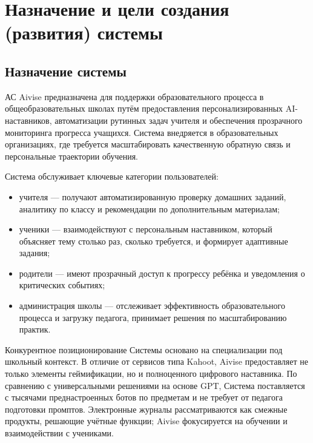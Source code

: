 \documentclass[14pt,a4paper]{extarticle}
\begin{document}
\section{Назначение и цели создания (развития) системы}
\subsection{Назначение системы}
АС Aivise предназначена для поддержки образовательного процесса в общеобразовательных школах путём предоставления персонализированных AI-наставников, автоматизации рутинных задач учителя и обеспечения прозрачного мониторинга прогресса учащихся. Система внедряется в образовательных организациях, где требуется масштабировать качественную обратную связь и персональные траектории обучения.

Система обслуживает ключевые категории пользователей:
\begin{itemize}
  \item учителя — получают автоматизированную проверку домашних заданий, аналитику по классу и рекомендации по дополнительным материалам;
  \item ученики — взаимодействуют с персональным наставником, который объясняет тему столько раз, сколько требуется, и формирует адаптивные задания;
  \item родители — имеют прозрачный доступ к прогрессу ребёнка и уведомления о критических событиях;
  \item администрация школы — отслеживает эффективность образовательного процесса и загрузку педагога, принимает решения по масштабированию практик.
\end{itemize}

Конкурентное позиционирование Системы основано на специализации под школьный контекст. В отличие от сервисов типа Kahoot, Aivise предоставляет не только элементы геймификации, но и полноценного цифрового наставника. По сравнению с универсальными решениями на основе GPT, Система поставляется с тысячами преднастроенных ботов по предметам и не требует от педагога подготовки промптов. Электронные журналы рассматриваются как смежные продукты, решающие учётные функции; Aivise фокусируется на обучении и взаимодействии с учениками.
\end{document}
